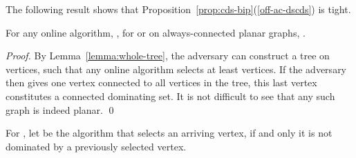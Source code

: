 The following result shows that
Proposition~\ref{prop:cds-bip}(\ref{off-ac-dscds}) is tight.

\begin{proposition}
For any online algorithm, \A, for \ds or \cds on always-connected
planar graphs, .
\end{proposition}
\begin{proof}
By Lemma~\ref{lemma:whole-tree}, the adversary can construct a tree on
 vertices, such that any online algorithm selects at least 
vertices.
If the adversary then gives one vertex connected to all  vertices
in the tree, this last vertex constitutes a connected dominating set.
It is not difficult to see that any such graph is indeed planar.
\qed\end{proof}


For \ds,
let \greedy be the algorithm that selects an
arriving vertex, if and only it is not dominated by a previously
selected vertex.


